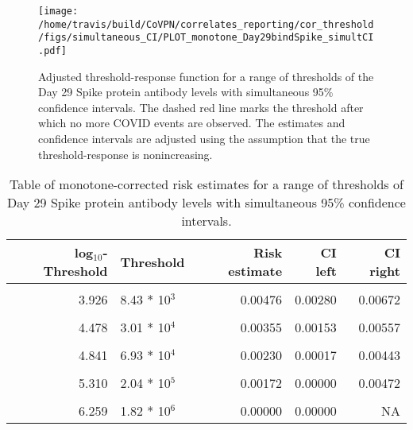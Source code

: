 \documentclass[]{book}
\theoremstyle{definition}
\theoremstyle{definition}
\theoremstyle{definition}
\newcommand{\1}{\mathbbm{1}}
\begin{document}
\begin{figure}[H]
\centering
\texttt{[image: /home/travis/build/CoVPN/correlates\_reporting/cor\_threshold/figs/simultaneous\_CI/PLOT\_monotone\_Day29bindSpike\_simultCI.pdf]}
\caption{Adjusted threshold-response function for a range of thresholds of the
  Day 29 Spike protein antibody levels with simultaneous 95\% confidence intervals. The dashed red line marks the threshold after which no more COVID events are observed. The estimates and confidence intervals are adjusted using the assumption that the true threshold-response is nonincreasing.}
\end{figure}
\begin{table}[!h]

\caption{\label{tab:unnamed-chunk-403}Table of monotone-corrected risk estimates for a range of thresholds of Day 29 Spike protein antibody levels with simultaneous 95\% confidence intervals.}
\centering
\begin{tabular}[t]{rlrrr}
\toprule
log$_{10}$-Threshold & Threshold & Risk estimate & CI left & CI right\\
\midrule
\cellcolor{gray!6}{3.202} & \cellcolor{gray!6}{1.59 * 10$^3$} & \cellcolor{gray!6}{0.00567} & \cellcolor{gray!6}{0.00364} & \cellcolor{gray!6}{0.00770}\\
3.926 & 8.43 * 10$^3$ & 0.00476 & 0.00280 & 0.00672\\
\cellcolor{gray!6}{4.187} & \cellcolor{gray!6}{1.54 * 10$^4$} & \cellcolor{gray!6}{0.00459} & \cellcolor{gray!6}{0.00253} & \cellcolor{gray!6}{0.00665}\\
4.478 & 3.01 * 10$^4$ & 0.00355 & 0.00153 & 0.00557\\
\cellcolor{gray!6}{4.658} & \cellcolor{gray!6}{4.55 * 10$^4$} & \cellcolor{gray!6}{0.00278} & \cellcolor{gray!6}{0.00076} & \cellcolor{gray!6}{0.00481}\\
4.841 & 6.93 * 10$^4$ & 0.00230 & 0.00017 & 0.00443\\
\cellcolor{gray!6}{5.022} & \cellcolor{gray!6}{1.05 * 10$^5$} & \cellcolor{gray!6}{0.00182} & \cellcolor{gray!6}{0.00000} & \cellcolor{gray!6}{0.00400}\\
5.310 & 2.04 * 10$^5$ & 0.00172 & 0.00000 & 0.00472\\
\cellcolor{gray!6}{5.523} & \cellcolor{gray!6}{3.33 * 10$^5$} & \cellcolor{gray!6}{0.00172} & \cellcolor{gray!6}{0.00000} & \cellcolor{gray!6}{0.00551}\\
6.259 & 1.82 * 10$^6$ & 0.00000 & 0.00000 & NA\\
\bottomrule
\end{tabular}
\end{table}
\end{document}
